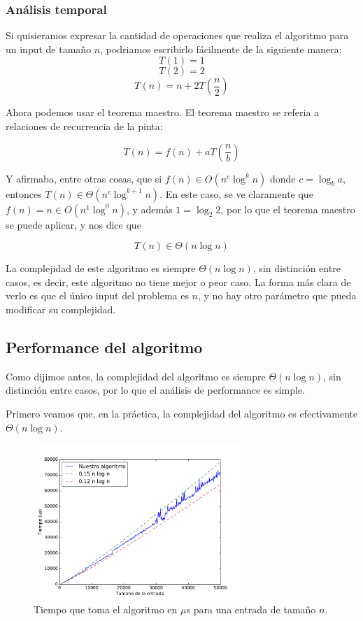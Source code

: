 \subsubsection{Análisis temporal}
Si quisieramos expresar la cantidad de operaciones que realiza el algoritmo para un input de tamaño $n$, podriamos escribirlo fácilmente de la siguiente manera:
\[T(1) = 1\]
\[T(2) = 2\]
\[T(n) = n + 2 T \left(\frac{n}{2}\right)\]

Ahora podemos usar el teorema maestro. El teorema maestro se referia a relaciones de recurrencia de la pinta:

\[T(n) = f(n) + a T\left(\frac{n}{b}\right)\]

Y afirmaba, entre otras cosas, que si $f(n) \in O(n^c \log^k n)$ donde $c = \log_b a$, entonces $T(n) \in \Theta(n^c \log^{k+1} n)$. En este caso, se ve claramente que $f(n) = n \in O(n^1 \log^0 n)$, y además $1 = \log_2 2$, por lo que el teorema maestro se puede aplicar, y nos dice que

\[T(n) \in \Theta(n \log n)\]

La complejidad de este algoritmo es siempre $\Theta(n \log n)$, sin distinción entre casos, es decir, este algoritmo no tiene mejor o peor caso. La forma más clara de verlo es que el único input del problema es $n$, y no hay otro parámetro que pueda modificar su complejidad.

\subsection{Performance del algoritmo}

Como dijimos antes, la complejidad del algoritmo es siempre $\Theta(n \log n)$, sin distinción entre casos, por lo que el análisis de performance es simple.

Primero veamos que, en la práctica, la complejidad del algoritmo es efectivamente $\Theta(n \log n)$.

\begin{figure}[H]
 \centering
	\includegraphics[width=0.7\textwidth]{img/tiempos/kaioken3.pdf}
	\caption{\footnotesize Tiempo que toma el algoritmo en $\mu$s para una entrada de tamaño $n$.}
	\label{fig:kaioken-tiempos3}
\end{figure}

